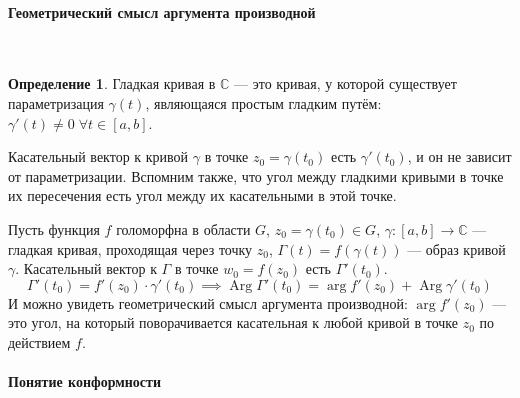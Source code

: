 \documentclass[11pt,openany,a4paper]{scrartcl}
\theoremstyle{plain}
\theoremstyle{definition}
\newtheorem{definition}[theorem]{Определение}
\newcommand\mb{\mathbb}
\newcommand{\complex}{\mb C}
\newcommand\lparagraph[1]{\paragraph{#1}\mbox{}\\}
\DeclareMathOperator{\Arg}{Arg}
\begin{document}
\lparagraph{Геометрический смысл аргумента производной}

\begin{definition}
	Гладкая кривая в $\complex$ — это кривая, у которой существует параметризация $\gamma(t)$, являющаяся простым
	гладким путём: $\gamma'(t) \neq 0\;\forall t \in [a, b]$.
\end{definition}

Касательный вектор к кривой $\gamma$ в точке $z_0 = \gamma(t_0)$ есть $\gamma'(t_0)$, и он не зависит от 
параметризации. Вспомним также, что угол между гладкими кривыми в точке их пересечения есть угол между их касательными 
в этой точке.

Пусть функция $f$ голоморфна в области $G$, $z_0 = \gamma(t_0) \in G$, $\gamma: [a, b] \to \complex$ — гладкая
кривая, проходящая
через точку $z_0$, $\Gamma(t) = f(\gamma(t))$ — образ кривой $\gamma$. Касательный вектор к $\Gamma$ в точке
$w_0 = f(z_0)$ есть $\Gamma'(t_0)$.
$$
\Gamma'(t_0) = f'(z_0) \cdot \gamma'(t_0) \implies \Arg \Gamma'(t_0) = \arg f'(z_0) + \Arg \gamma'(t_0)
$$
И можно увидеть геометрический смысл аргумента производной: $\arg f'(z_0)$ — это угол, на который поворачивается
касательная к любой кривой в точке $z_0$ по действием $f$.

\lparagraph{Понятие конформности}
\end{document}
